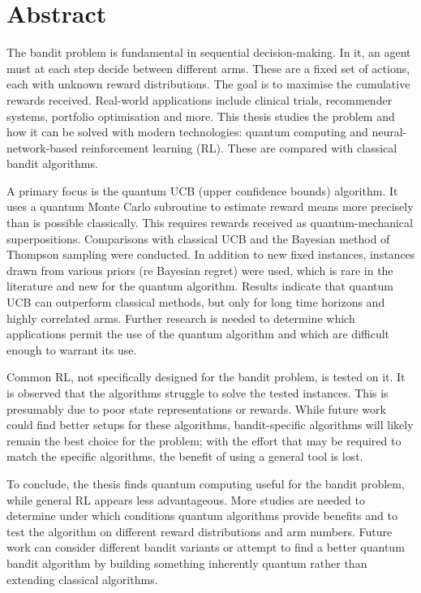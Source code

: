 
\chapter{Abstract}
The bandit problem is fundamental in sequential decision-making.
In it, an agent must at each step decide between different arms.
These are a fixed set of actions, each with unknown reward distributions.
The goal is to maximise the cumulative rewards received.
Real-world applications include clinical trials, recommender systems, portfolio optimisation and more.
This thesis studies the problem and how it can be solved with modern technologies: quantum computing and neural-network-based reinforcement learning (RL).
These are compared with classical bandit algorithms.

A primary focus is the quantum UCB (upper confidence bounds) algorithm.
It uses a quantum Monte Carlo subroutine to estimate reward means more precisely than is possible classically.
This requires rewards received as quantum-mechanical superpositions.
Comparisons with classical UCB and the Bayesian method of Thompson sampling were conducted.
In addition to new fixed instances, instances drawn from various priors (re Bayesian regret) were used, which is rare in the literature and new for the quantum algorithm.
Results indicate that quantum UCB can outperform classical methods, but only for long time horizons and highly correlated arms.
Further research is needed to determine which applications permit the use of the quantum algorithm and which are difficult enough to warrant its use.

Common RL, not specifically designed for the bandit problem, is tested on it.
It is observed that the algorithms struggle to solve the tested instances.
This is presumably due to poor state representations or rewards.
While future work could find better setups for these algorithms, bandit-specific algorithms will likely remain the best choice for the problem; with the effort that may be required to match the specific algorithms, the benefit of using a general tool is lost.

To conclude, the thesis finds quantum computing useful for the bandit problem, while general RL appears less advantageous.
More studies are needed to determine under which conditions quantum algorithms provide benefits and to test the algorithm on different reward distributions and arm numbers.
Future work can consider different bandit variants or attempt to find a better quantum bandit algorithm by building something inherently quantum rather than extending classical algorithms.



\cleardoublepage